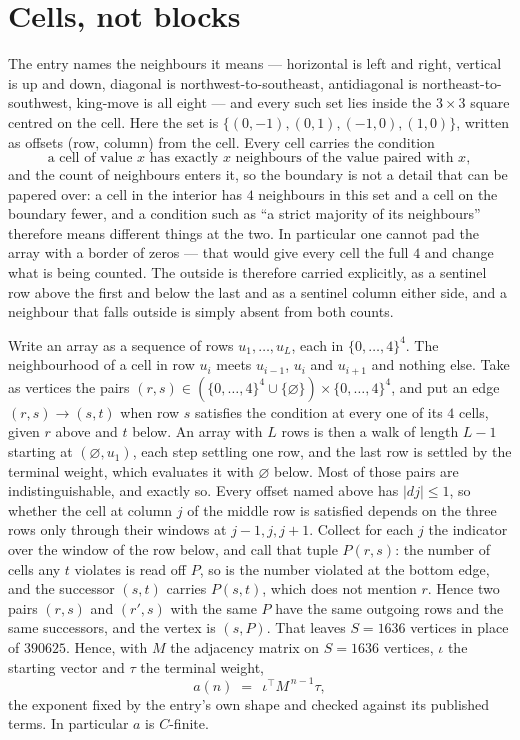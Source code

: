 \documentclass[11pt,a4paper]{article}
\theoremstyle{plain}
\theoremstyle{definition}
\begin{document}
\section{Cells, not blocks}

The entry names the neighbours it means --- horizontal is left and right, vertical is up and
down, diagonal is northwest-to-southeast, antidiagonal is northeast-to-southwest, king-move is
all eight --- and every such set lies inside the $3\times3$ square centred on the cell. Here
the set is $\{(0,-1), (0,1), (-1,0), (1,0)\}$, written as offsets (row, column) from the cell. Every cell carries
the condition
\[
\text{a cell of value }x\text{ has exactly }x\text{ neighbours of the value paired with }x,
\]
and the count of neighbours enters it, so the boundary is not a detail that can be papered
over: a cell in the interior has $4$ neighbours in this set and a cell on the boundary
fewer, and a condition such as ``a strict majority of its neighbours'' therefore means
different things at the two. In particular one cannot pad the array with a border of zeros ---
that would give every cell the full $4$ and change what is being counted. The outside is
therefore carried
explicitly, as a sentinel row above the first and below the last and as a sentinel column
either side, and a neighbour that falls outside is simply absent from both counts.

Write an array as a sequence of rows $u_1,\dots,u_L$, each in
$\{0,\dots,4\}^{4}$. The neighbourhood of a cell in row $u_i$ meets $u_{i-1}$,
$u_i$ and $u_{i+1}$ and nothing else. Take as vertices the pairs
$(r,s)\in(\{0,\dots,4\}^{4}\cup\{\varnothing\})\times\{0,\dots,4\}^{4}$,
and put an edge $(r,s)\to(s,t)$ when row $s$ satisfies the condition at every one of its
$4$ cells, given $r$ above and $t$ below. An array with $L$ rows is then a walk of length
$L-1$ starting at $(\varnothing,u_1)$, each step settling one row, and the last row is
settled by the terminal weight, which evaluates it with $\varnothing$ below. Most of those pairs are indistinguishable, and exactly so. Every offset named above has $|dj|\le 1$, so whether the cell at column $j$ of the middle row is satisfied depends on the three rows only through their windows at $j-1,j,j+1$. Collect for each $j$ the indicator over the window of the row below, and call that tuple $P(r,s)$: the number of cells any $t$ violates is read off $P$, so is the number violated at the bottom edge, and the successor $(s,t)$ carries $P(s,t)$, which does not mention $r$. Hence two pairs $(r,s)$ and $(r',s)$ with the same $P$ have the same outgoing rows and the same successors, and the vertex is $(s,P)$. That leaves $S=1636$ vertices in place of $390625$. Hence,
with $M$ the adjacency matrix on $S=1636$ vertices, $\iota$ the starting vector and $\tau$ the
terminal weight,
\[
a(n)\;=\;\,\iota^{\!\top}M^{\,n-1}\tau ,
\]
the exponent fixed by the entry's own shape and checked against its published terms. In
particular $a$ is $C$-finite.
\end{document}
